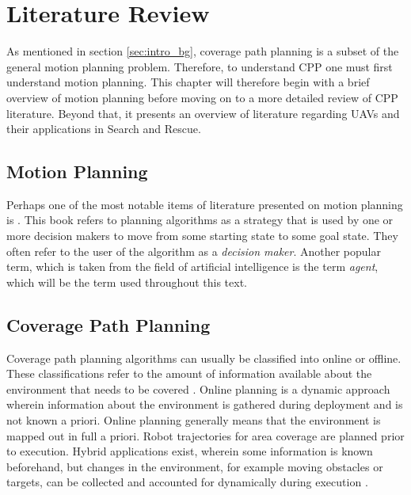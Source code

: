 \chapter{Literature Review}
\label{chp:back}
As mentioned in section \ref{sec:intro_bg}, coverage path planning is a subset of the general motion planning problem. Therefore, to understand CPP one must first understand motion planning. This chapter will therefore begin with a brief overview of motion planning before moving on to a more detailed review of CPP literature. Beyond that, it presents an overview of literature regarding UAVs and their applications in Search and Rescue.

\section{Motion Planning}
Perhaps one of the most notable items of literature presented on motion planning is \cite{Lavalle2006}. This book refers to planning algorithms as a strategy that is used by one or more decision makers to move from some starting state to some goal state. They often refer to the user of  the algorithm as a \emph{decision maker}. Another popular term, which is taken from the field of artificial intelligence is the term \emph{agent}, which will be the  term used throughout this text.

\section{Coverage Path Planning}
Coverage path planning algorithms can usually be classified into online or offline. These classifications refer to the amount of information available about the environment that needs to be covered \cite{CPP-Survey-2019}. Online planning is a dynamic approach wherein information about the environment is gathered during deployment and is not known a priori. Online planning generally means that the environment is mapped out in full a priori. Robot trajectories for area coverage are planned prior to execution. Hybrid applications exist, wherein some information is known beforehand, but changes in the environment, for example moving obstacles or targets, can be collected and accounted for dynamically during execution \cite{Kamrani2014}.


